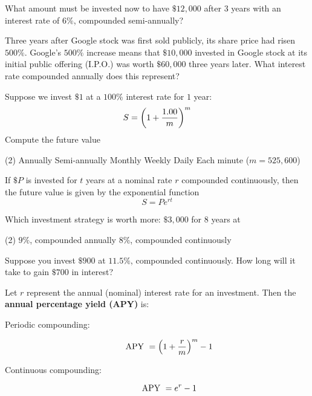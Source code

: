 \documentclass[../mathNotesPreamble]{subfiles}
\begin{document}
  \begin{ex*}
    What amount must be invested now to have $\$12,000$ after $3$ years with an interest rate of $6\%$, compounded semi-annually?
  \end{ex*}

  \begin{ex*}
    Three years after Google stock was first sold publicly, its share price had risen $500\%$. Google’s $500\%$ increase means that $\$10,000$ invested in Google stock at its initial public offering (I.P.O.) was worth $\$60,000$ three years later. What interest rate compounded annually does this represent?
  \end{ex*}
  \pagebreak

  \begin{ex*}
    Suppose we invest $\$1$ at a $100\%$ interest rate for $1$ year:
      \[S={\left(1+\frac{1.00}{m}\right)}^m\]
    Compute the future value
  \end{ex*}
  \begin{extasks}[after-item-skip=\stretch{1}](2)
    \task Annually
    \task Semi-annually
    \task Monthly
    \task Weekly
    \task Daily
    \task Each minute ($m=525,600$)
  \end{extasks}
  \pagebreak

  \begin{defn*}
    If $\$P$ is invested for $t$ years at a nominal rate $r$ compounded continuously, then the future value is given by the exponential function
      \[S=Pe^{rt}\]
  \end{defn*}

  \begin{ex*}
    Which investment strategy is worth more: $\$3,000$ for $8$ years at
      \begin{extasks}[after-item-skip=\stretch{1}](2)
        \task $9\%$, compounded annually
        \task $8\%$, compounded continuously
      \end{extasks}
  \end{ex*}

  \begin{ex*}
    Suppose you invest $\$900$ at $11.5\%$, compounded continuously. How long will it take to gain $\$700$ in interest?
  \end{ex*}
  \pagebreak
  \begin{defn*}
    Let $r$ represent the annual (nominal) interest rate for an investment. Then the \textbf{annual percentage yield (APY)} is:
    \begin{description}
      \item[Periodic compounding:]
        \[\textnormal{APY }={\left(1+\frac{r}{m}\right)}^m-1\]
      \item[Continuous compounding:]
        \[\textnormal{APY }=e^r-1\]
    \end{description}
  \end{defn*}

  \pagebreak
\end{document}
